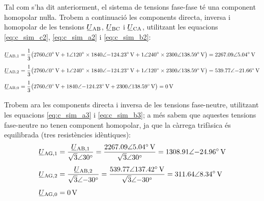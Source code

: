 \begin{exemple}
    Tal com s'ha dit anteriorment, el sistema de tensions fase-fase   té una component homopolar nuŀla.     Trobem a continuació les components directa, inversa i homopolar de les
    tensions $\cmplx{U}\ped{AB}$, $\cmplx{U}\ped{BC}$ i
    $\cmplx{U}\ped{CA}$, utilitzant les equacions
    \eqref{eq:c_sim_c2}, \eqref{eq:c_sim_a2} i \eqref{eq:c_sim_b2}:

    \begin{align*}
    \cmplx{U}\ped{AB,1} &= \frac{1}{3} \big(
    \complexqty{2760:0}{V} + \complexnum{1:120} \times \complexqty{1840:-124,23}{V} +
    \complexnum{1:240} \times \complexqty{2300:138,59}{V}\big) = \complexqty{2267,09:5,04}{V} \\[1ex]
    \cmplx{U}\ped{AB,2} &= \frac{1}{3} \big(
    \complexqty{2760:0}{V} + \complexnum{1:240} \times \complexqty{1840:-124,23}{V} +
    \complexnum{1:120} \times \complexqty{2300:138,59}{V} \big) = \complexqty{539,77:-21,66}{V} \\[1ex]
    \cmplx{U}\ped{AB,0} &= \frac{1}{3} \big(
    \complexqty{2760:0}{V} + \complexqty{1840:-124,23}{V} + \complexqty{2300:138,59}{V}\big) = \qty{0}{V}
    \end{align*}

    Trobem ara les components directa i inversa
    de les tensions fase-neutre, utilitzant les equacions
    \eqref{eq:c_sim_a3} i \eqref{eq:c_sim_b3}; a més sabem que aquestes tensions fase-neutre no
    tenen component homopolar, ja que la càrrega trifàsica és equilibrada
    (tres resistències idèntiques):
    \begin{align*}
        \cmplx{U}\ped{AG,1} &=
        \frac{\cmplx{U}\ped{AB,1}}{\sqrt{3}\angle\ang{30}} =
        \frac{\complexqty{2267,09:5,04}{V}}{\sqrt{3}\angle\ang{30}} =
        \complexqty{1308,91:-24,96}{V} \\[1ex]
        \cmplx{U}\ped{AG,2} &=
        \frac{\cmplx{U}\ped{AB,2}}{\sqrt{3}\angle{\ang{-30}}} =
        \frac{\complexqty{539,77:137,42}{V}}{\sqrt{3}\angle{\ang{-30}}} =
        \complexqty{311,64:8,34}{V} \\[1ex]
        \cmplx{U}\ped{AG,0} &= \qty{0}{V}
    \end{align*}



\end{exemple}
